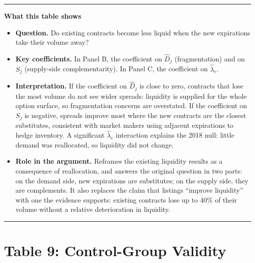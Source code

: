 \documentclass[11pt]{article}
\newenvironment{tableshows}
  {\begin{center}\begin{minipage}{0.95\textwidth}\small
   \hrule\vspace{4pt}
   \textbf{What this table shows}\par
   \begin{itemize}[leftmargin=12pt,topsep=4pt,itemsep=4pt,parsep=0pt]}
  {\end{itemize}\vspace{2pt}\hrule\end{minipage}\end{center}}
\begin{document}
\begin{tableshows}
\item \textbf{Question.} Do existing contracts become less liquid when the new expirations take their volume away?
\item \textbf{Key coefficients.} In Panel B, the coefficient on $\widehat{D}_j$ (fragmentation) and on $S_j$ (supply-side complementarity). In Panel C, the coefficient on $\hat\lambda_e$.
\item \textbf{Interpretation.} If the coefficient on $\widehat{D}_j$ is close to zero, contracts that lose the most volume do not see wider spreads: liquidity is supplied for the whole option surface, so fragmentation concerns are overstated. If the coefficient on $S_j$ is negative, spreads improve most where the new contracts are the closest substitutes, consistent with market makers using adjacent expirations to hedge inventory. A significant $\hat\lambda_e$ interaction explains the 2018 null: little demand was reallocated, so liquidity did not change.
\item \textbf{Role in the argument.} Reframes the existing liquidity results as a consequence of reallocation, and answers the original question in two parts: on the demand side, new expirations are substitutes; on the supply side, they are complements. It also replaces the claim that listings ``improve liquidity'' with one the evidence supports: existing contracts lose up to 40\% of their volume without a relative deterioration in liquidity.
\end{tableshows}

\clearpage
\section*{Table 9: Control-Group Validity}
\end{document}
